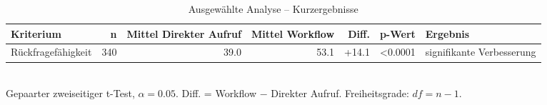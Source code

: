 \begin{table}[htbp]
\centering
\caption{Ausgewählte Analyse -- Kurzergebnisse}
\begin{tabular}{lrrrrrl}
\toprule
Kriterium & n & Mittel Direkter Aufruf & Mittel Workflow & Diff. & p-Wert & Ergebnis \\
\midrule
Rückfragefähigkeit & 340 & 39.0 & 53.1 & +14.1 & <0.0001 & signifikante Verbesserung \\
\bottomrule
\end{tabular}
\\[2mm]
\footnotesize Gepaarter zweiseitiger t-Test, $\alpha=0.05$. Diff. = Workflow $-$ Direkter Aufruf. Freiheitsgrade: $df=n-1$.
\end{table}
